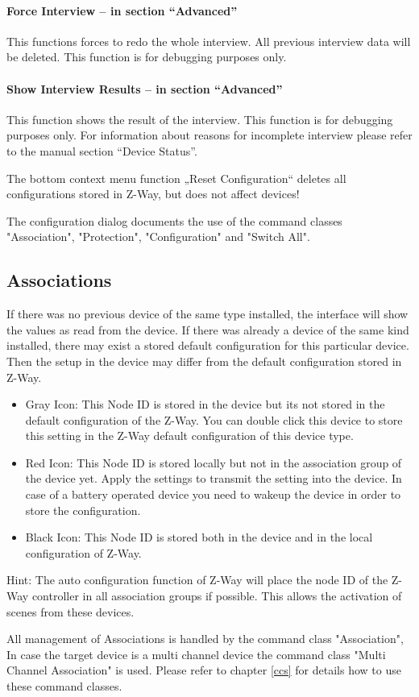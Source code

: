 \paragraph{Force Interview – in section “Advanced”}

This functions forces to redo the whole interview. All previous interview data will be deleted. This function is for debugging purposes only.

\paragraph{Show Interview Results – in section “Advanced”}

This function shows the result of the interview. This function is for debugging purposes only. For information about reasons for incomplete interview please refer to the manual section “Device Status”.

The bottom context menu function  „Reset Configuration“ deletes all configurations stored in Z-Way, but does not affect devices!



The configuration dialog documents the use of the command classes "Association", "Protection", "Configuration" and "Switch All".
  
\subsection{Associations}


If there was no previous device of the same type installed, the interface will show the values as read from the device. If there was already a device of the same kind installed, there may exist a stored default configuration for this particular device. Then the setup in the device may differ from the default configuration stored in Z-Way.
\begin{itemize}
\item Gray Icon: This Node ID is stored in the device but its not stored in the default configuration of the Z-Way. You can double click this device to store this setting in the Z-Way default configuration of this device type.
\item Red Icon: This Node ID is stored locally but not in the association group of the device yet. Apply the settings to transmit the setting into the device.  In case of a battery operated device you need to wakeup the device in order to store the configuration.
\item Black Icon: This Node ID is stored both in the device and in the local configuration of Z-Way.
\end{itemize}
Hint: The auto configuration function of Z-Way will place the node ID of the Z-Way controller in all association 
groups if possible. This allows the activation of scenes from these devices. 

All management of Associations is handled by the command class "Association", In case the target device is a multi 
channel device the command class "Multi Channel Association" is used. Please refer to 
chapter \ref{ccs} for details how to use these command classes.




